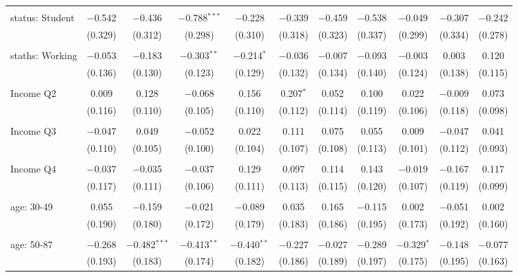 \begin{tabular}{@{\extracolsep{5pt}}lcccccccccc}
  & & & & & & & & & & \\ 
 status: Student & $-$0.542 & $-$0.436 & $-$0.788$^{***}$ & $-$0.228 & $-$0.339 & $-$0.459 & $-$0.538 & $-$0.049 & $-$0.307 & $-$0.242 \\ 
  & (0.329) & (0.312) & (0.298) & (0.310) & (0.318) & (0.323) & (0.337) & (0.299) & (0.334) & (0.278) \\ 
  & & & & & & & & & & \\ 
 staths: Working & $-$0.053 & $-$0.183 & $-$0.303$^{**}$ & $-$0.214$^{*}$ & $-$0.036 & $-$0.007 & $-$0.093 & $-$0.003 & 0.003 & 0.120 \\ 
  & (0.136) & (0.130) & (0.123) & (0.129) & (0.132) & (0.134) & (0.140) & (0.124) & (0.138) & (0.115) \\ 
  & & & & & & & & & & \\ 
 Income Q2 & 0.009 & 0.128 & $-$0.068 & 0.156 & 0.207$^{*}$ & 0.052 & 0.100 & 0.022 & $-$0.009 & 0.073 \\ 
  & (0.116) & (0.110) & (0.105) & (0.110) & (0.112) & (0.114) & (0.119) & (0.106) & (0.118) & (0.098) \\ 
  & & & & & & & & & & \\ 
 Income Q3 & $-$0.047 & 0.049 & $-$0.052 & 0.022 & 0.111 & 0.075 & 0.055 & 0.009 & $-$0.047 & 0.041 \\ 
  & (0.110) & (0.105) & (0.100) & (0.104) & (0.107) & (0.108) & (0.113) & (0.101) & (0.112) & (0.093) \\ 
  & & & & & & & & & & \\ 
 Income Q4 & $-$0.037 & $-$0.035 & $-$0.037 & 0.129 & 0.097 & 0.114 & 0.143 & $-$0.019 & $-$0.167 & 0.117 \\ 
  & (0.117) & (0.111) & (0.106) & (0.111) & (0.113) & (0.115) & (0.120) & (0.107) & (0.119) & (0.099) \\ 
  & & & & & & & & & & \\ 
 age: 30-49 & 0.055 & $-$0.159 & $-$0.021 & $-$0.089 & 0.035 & 0.165 & $-$0.115 & 0.002 & $-$0.051 & 0.002 \\ 
  & (0.190) & (0.180) & (0.172) & (0.179) & (0.183) & (0.186) & (0.195) & (0.173) & (0.192) & (0.160) \\ 
  & & & & & & & & & & \\ 
 age: 50-87 & $-$0.268 & $-$0.482$^{***}$ & $-$0.413$^{**}$ & $-$0.440$^{**}$ & $-$0.227 & $-$0.027 & $-$0.289 & $-$0.329$^{*}$ & $-$0.148 & $-$0.077 \\ 
  & (0.193) & (0.183) & (0.174) & (0.182) & (0.186) & (0.189) & (0.197) & (0.175) & (0.195) & (0.163) \\ 

\end{tabular}
